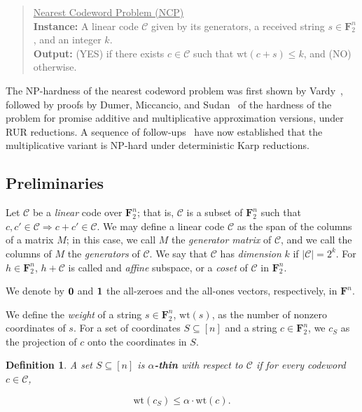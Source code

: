 \documentclass{article}
\newtheorem{definition}{Definition}
\newcommand{\FF}{\mathbf{F}}
\newcommand{\NCP}{\textsc{NCP}}
\newcommand{\calC}{\mathcal{C}}
\newcommand{\wt}{\text{wt}}
\begin{document}
\begin{quote}
    \underline{Nearest Codeword Problem (\NCP)}\\
    \textbf{Instance:} A linear code $\calC$ given by its generators, a received string $s \in \FF_2^n$, and an integer $k$.\\
    \textbf{Output:} (YES) if there exists $c \in \calC$ such that $\wt(c + s) \leq k$, and (NO) otherwise.
\end{quote}

The NP-hardness of the nearest codeword problem was first shown by Vardy~\cite{vardy1997intractability}, followed by proofs by Dumer, Miccancio, and Sudan~\cite{dumer2003approx} of the hardness of the problem for promise additive and multiplicative approximation versions, under RUR reductions. A sequence of follow-ups~\cite{Khot05,AustrinKhot,Micciancio2014, 
BhattiproluLee24, bhattiproluGLR2025} have now established that the multiplicative variant is NP-hard under deterministic Karp reductions.

\subsection{Preliminaries}\label{sec:prelims}

Let $\calC$ be a \emph{linear} code over $\FF_2^n$; that is, $\calC$ is a subset of $\FF_2^n$ such that $c, c' \in \calC \Rightarrow c + c' \in \calC$. We may define a linear code $\calC$ as the span of the columns of a matrix $M$; in this case, we call $M$ the \emph{generator matrix} of $\calC$, and we call the columns of $M$ the \emph{generators} of $\calC$. We say that $\calC$ has \emph{dimension} $k$ if $|\calC| = 2^k$. For $h\in\FF_2^n$, $h+\calC$ is called and \emph{affine} subspace, or a \emph{coset} of $\calC$ in $\FF_2^n$. 

We denote by ${\bf 0}$ and ${\bf 1}$ the all-zeroes and the all-ones vectors, respectively, in $\FF^n$.

We define the \emph{weight} of a string $s \in \FF_2^n$, $\wt(s)$, as the number of nonzero coordinates of $s$. For a set of coordinates $S \subseteq [n]$ and a string $c \in \FF_2^n$, we $c_S$ as the projection of $c$ onto the coordinates in $S$.

\begin{definition}
A set $S \subseteq [n]$ is \textbf{$\alpha$-thin} with respect to $\calC$ if for every codeword $c \in \calC$,

\[\wt(c_S) \leq \alpha \cdot \wt(c).\]
\end{definition}
\end{document}
